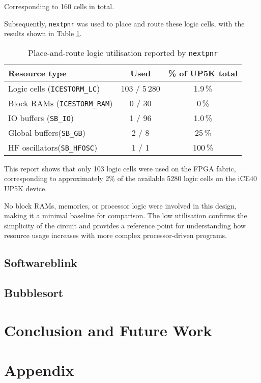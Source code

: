 \documentclass[a4paper,10pt]{article}
\begin{document}
Corresponding to 160 cells in total.

Subsequently, \texttt{nextpnr} was used to place and route these logic cells,
with the results shown in Table \ref{tab:hardware_pnr_report}.

\begin{table}[H]
    \centering
    \begin{tabularx}{0.7\textwidth}{X c c}
        \toprule
        Resource type & Used & \% of UP5K total \\ \midrule
        Logic cells (\texttt{ICESTORM\_LC}) & 103 / 5\,280 & 1.9\,\% \\
        Block RAMs    (\texttt{ICESTORM\_RAM}) & 0 / 30 & 0\,\% \\
        IO buffers    (\texttt{SB\_IO})         & 1 / 96 & 1.0\,\% \\
        Global buffers(\texttt{SB\_GB})         & 2 / 8  & 25\,\% \\
        HF oscillators(\texttt{SB\_HFOSC})      & 1 / 1  & 100\,\% \\ \bottomrule
    \end{tabularx}
    \caption{Place-and-route logic utilisation reported by \texttt{nextpnr}}
    \label{tab:hardware_pnr_report}
\end{table}

This report shows that only 103 logic cells were used on the FPGA fabric, 
corresponding to approximately 2\% of the available 5280 logic cells 
on the iCE40 UP5K device.


No block RAMs, memories, or processor logic were involved in this design, 
making it a minimal baseline for comparison. 
The low utilisation confirms the simplicity of the circuit 
and provides a reference point for understanding 
how resource usage increases with more complex processor-driven programs.


\subsection{Softwareblink}
\label{sec:Softwareblink}

\subsection{Bubblesort}
\label{sec:Bubblesort}

\section{Conclusion and Future Work}
\label{sec:Conclusion_and_Future_Work}

\appendix
\section{Appendix}
\end{document}

